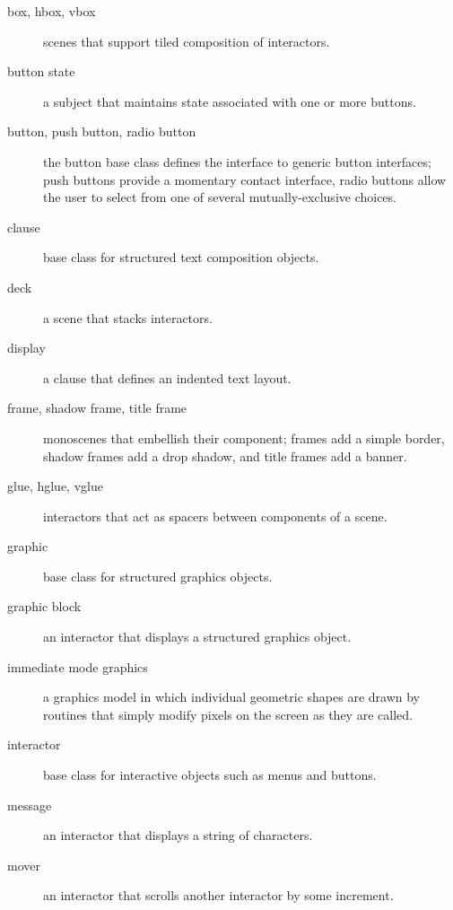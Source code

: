 \begin{description}

\item [box, hbox, vbox] scenes that support tiled composition of
interactors.

\item [button state] a subject that maintains state associated with 
one or more buttons.

\item [button, push button, radio button] the button base class
defines the interface to generic button interfaces; push buttons
provide a momentary contact interface, radio buttons allow the user
to select from one of several mutually-exclusive choices.

\item [clause] base class for structured text composition objects.

\item [deck] a scene that stacks interactors.

\item [display] a clause that defines an indented text layout.

\item [frame, shadow frame, title frame] monoscenes that embellish
their component; frames add a simple border, shadow frames add a drop
shadow, and title frames add a banner.

\item [glue, hglue, vglue] interactors that act as spacers between
components of a scene.

\item [graphic] base class for structured graphics objects.

\item [graphic block] an interactor that displays a structured
graphics object.

\item [immediate mode graphics] a graphics model in which
individual geometric shapes are drawn by
routines that simply modify pixels on the screen as
they are called.

\item [interactor] base class for interactive objects such as menus
and buttons.

\item [message] an interactor that displays a string of characters.

\item [mover] an interactor that scrolls another interactor by some
increment.


\end{description}
